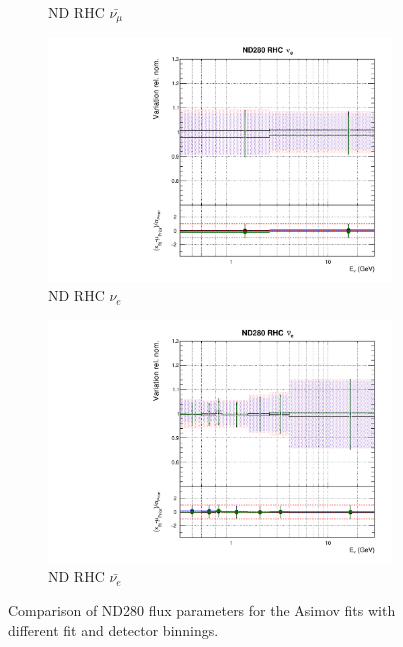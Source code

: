 \begin{figure}[!htbp]
\begin{subfigure}{0.45\textwidth}
  \caption{ND RHC $\bar{\nu_{\mu}}$}
\end{subfigure}
\begin{subfigure}{0.45\textwidth}
  \centering
  \includegraphics[width=0.75\linewidth]{figs/polyasmvsflux_6}
  \caption{ND RHC $\nu_{e}$}
\end{subfigure}
\begin{subfigure}{0.45\textwidth}
  \centering
  \includegraphics[width=0.75\linewidth]{figs/polyasmvsflux_7}
  \caption{ND RHC $\bar{\nu_e}$}
\end{subfigure}
\caption{Comparison of ND280 flux parameters for the Asimov fits with different fit and detector binnings.}
\label{fig:polyasmvsfluxNDapp}
\end{figure}

